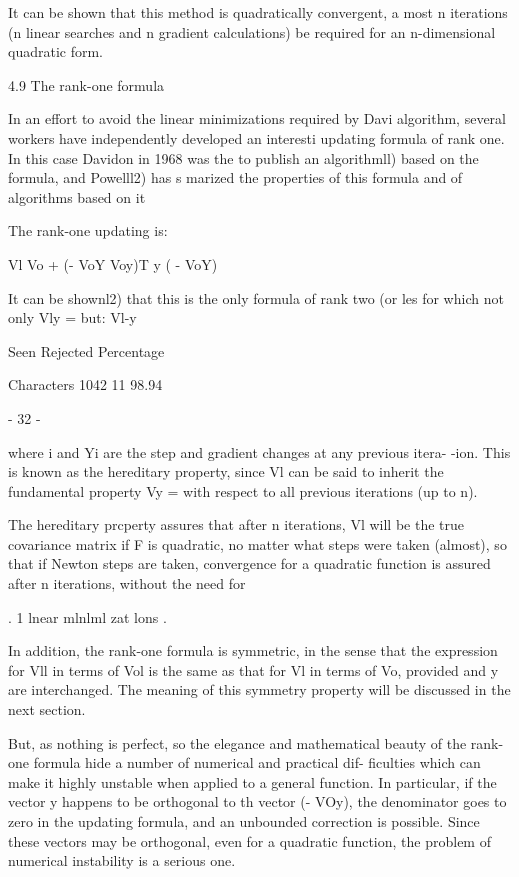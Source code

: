  
     It can be shown that this method is quadratically convergent, a
most n iterations (n linear searches and n gradient calculations) be
required for an n-dimensional quadratic form.
 
 
4.9  The rank-one formula
 
     In an effort to avoid the linear minimizations required by Davi
algorithm, several workers have independently developed an interesti
updating formula of rank one.  In this case Davidon in 1968 was the
to publish an algorithmll) based on the formula, and Powelll2) has s
marized the properties of this formula and of algorithms based on it
 
     The rank-one updating is:
 
 
                  Vl  Vo + (- VoY      Voy)T
                                     y ( - VoY)
 
 
It can be shownl2) that this is the only formula of rank two (or les
for which not only Vly =  but:
                           Vl-y 
 
                 Seen Rejected  Percentage
 
Characters       1042       11   98.94
 
                                 - 32 -
 
 
where i and Yi are the step and gradient changes at any previous itera-
-ion.  This is known as the hereditary property, since Vl can be said to
inherit the fundamental property Vy =  with respect to all previous
iterations (up to n).
 
     The hereditary prcperty assures that after n iterations, Vl will be
the true covariance matrix if F is quadratic, no matter what steps were
taken (almost), so that if Newton steps are taken, convergence for a
quadratic function is assured after n iterations, without the need for
 
         .
1 lnear mlnlml zat lons .
 
     In addition, the rank-one formula is symmetric, in the sense that
the expression for Vll in terms of Vol is the same as that for Vl in
terms of Vo, provided  and y are interchanged.  The meaning of this
symmetry property will be discussed in the next section.
 
     But, as nothing is perfect, so the elegance and mathematical beauty
of the rank-one formula hide a number of numerical and practical dif-
ficulties which can make it highly unstable when applied to a general
function.  In particular, if the vector y happens to be orthogonal to th
vector (- VOy), the denominator goes to zero in the updating formula,
and an unbounded correction is possible.  Since these vectors may be
orthogonal, even for a quadratic function, the problem of numerical
instability is a serious one.
 
